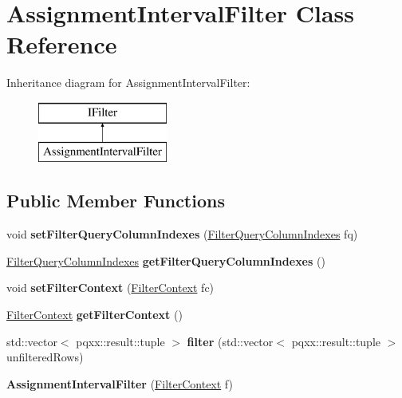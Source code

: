 \hypertarget{classAssignmentIntervalFilter}{}\section{Assignment\+Interval\+Filter Class Reference}
\label{classAssignmentIntervalFilter}
Inheritance diagram for Assignment\+Interval\+Filter\+:\begin{figure}[H]
\begin{center}
\leavevmode
\includegraphics[height=2.000000cm]{classAssignmentIntervalFilter}
\end{center}
\end{figure}
\subsection*{Public Member Functions}
\begin{DoxyCompactItemize}
\item 
\mbox{\label{classAssignmentIntervalFilter_a7763deed2ff29d0b97ee2648e4c7a87a}} 
void {\bfseries set\+Filter\+Query\+Column\+Indexes} (\hyperlink{structFilterQueryColumnIndexes}{Filter\+Query\+Column\+Indexes} fq)
\item 
\mbox{\label{classAssignmentIntervalFilter_acda0705d8c1e9a28c7a0808b3dd5e26e}} 
\hyperlink{structFilterQueryColumnIndexes}{Filter\+Query\+Column\+Indexes} {\bfseries get\+Filter\+Query\+Column\+Indexes} ()
\item 
\mbox{\label{classAssignmentIntervalFilter_a8c287c27d918c3aa708b6f46cba11a90}} 
void {\bfseries set\+Filter\+Context} (\hyperlink{structFilterContext}{Filter\+Context} fc)
\item 
\mbox{\label{classAssignmentIntervalFilter_a038d995082af531cc9c650c08cd1224e}} 
\hyperlink{structFilterContext}{Filter\+Context} {\bfseries get\+Filter\+Context} ()
\item 
\mbox{\label{classAssignmentIntervalFilter_a9013b1e23261151e22aa4b78980f5279}} 
std\+::vector$<$ pqxx\+::result\+::tuple $>$ {\bfseries filter} (std\+::vector$<$ pqxx\+::result\+::tuple $>$ unfiltered\+Rows)
\item 
\mbox{\label{classAssignmentIntervalFilter_a74be4426b988fcbde79e7b6b181e567d}} 
{\bfseries Assignment\+Interval\+Filter} (\hyperlink{structFilterContext}{Filter\+Context} f)
\end{DoxyCompactItemize}
